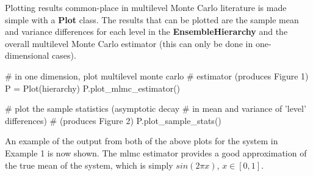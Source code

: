 \documentclass[10pt,letterpaper,extrafontsizes]{memoir}
\newcommand\pythonclass[1]{\textbf{\color{deepred}#1}}
\begin{document}
Plotting results common-place in multilevel Monte Carlo literature is made simple with a \pythonclass{Plot} class. The results that can be plotted are the sample mean and variance differences for each level in the \pythonclass{EnsembleHierarchy} and the overall multilevel Monte Carlo estimator (this can only be done in one-dimensional cases). \\

\begin{python}
# in one dimension, plot multilevel monte carlo
# estimator (produces Figure 1)
P = Plot(hierarchy)
P.plot_mlmc_estimator()
\end{python}

\begin{python}
# plot the sample statistics (asymptotic decay
# in mean and variance of 'level' differences)
# (produces Figure 2)
P.plot_sample_stats()
\end{python}

An example of the output from both of the above plots for the system in Example 1 is now shown. The mlmc estimator provides a good approximation of the true mean of the system, which is simply $sin(2\pi x)$, $x \in [0, 1]$. 
\end{document}
